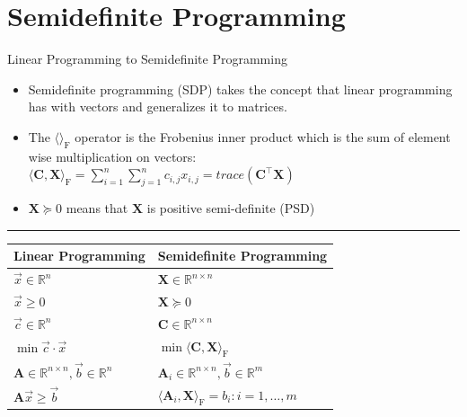 \documentclass[
	11pt, %
]{beamer}
\begin{document}
\section{Semidefinite Programming}
\begin{frame}[label={sec:org73100b6}]{Linear Programming to Semidefinite Programming}
\begin{itemize}
\item Semidefinite programming (SDP) takes the concept that linear programming has
with vectors and generalizes it to matrices.
\end{itemize}

\begin{itemize}
\item The \( \langle \rangle_{\mathrm{F}} \) operator is the Frobenius inner product which is the sum of element wise multiplication on vectors:
\( \langle \mathbf{C},  \mathbf{X} \rangle_{\mathrm{F}} = \sum_{i = 1}^n \sum_{j = 1}^n c_{i, j} x_{i, j} = trace(\mathbf{C}^\top \mathbf{X}) \)
\item \( \mathbf{X} \succeq 0 \) means that \( \mathbf{X} \) is positive semi-definite (PSD)
\end{itemize}
\noindent\rule{\textwidth}{0.5pt}
\begin{center}
\begin{tabular}{ll}
Linear Programming & Semidefinite Programming\\[0pt]
\hline
\(\vec{x} \in \mathbb{R}^n\) & \(\mathbf{X} \in \mathbb{R}^{n \times n}\)\\[0pt]
\(\vec{x} \geq 0\) & \(\mathbf{X} \succeq 0\)\\[0pt]
\(\vec{c} \in \mathbb{R}^n\) & \(\mathbf{C} \in \mathbb{R}^{n \times n}\)\\[0pt]
\(\min \vec{c} \cdot \vec{x}\) & \(\min \langle \mathbf{C}, \mathbf{X}\rangle_{\mathrm{F}} \)\\[0pt]
\(\mathbf{A} \in \mathbb{R}^{n \times n}, \vec{b} \in \mathbb{R}^n\) & \(\mathbf{A}_{i} \in \mathbb{R}^{n \times n}, \vec{b} \in \mathbb{R}^m\)\\[0pt]
\(\mathbf{A} \vec{x} \geq \vec{b}\) & \(\langle \mathbf{A}_i, \mathbf{X}\rangle_{\mathrm{F}} = b_i : i = 1, \ldots, m\)\\[0pt]
\end{tabular}
\end{center}
\end{frame}
\end{document}
